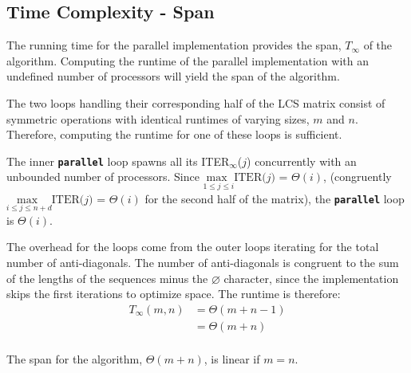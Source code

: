 \documentclass[usletter, 11pt]{extarticle}
\begin{document}
        \subsection{Time Complexity - Span} The running time for the parallel
        implementation provides the span, $T_{\infty}$ of the algorithm.
        Computing the runtime of the parallel implementation with an undefined
        number of processors will yield the span of the algorithm.

        The two loops handling their corresponding half of the LCS matrix
        consist of symmetric operations with identical runtimes of varying
        sizes, $m$ and $n$. Therefore, computing the runtime for one of these
        loops is sufficient.

        The inner \texttt{\textbf{parallel}} loop spawns all
        its ITER$_\infty$($j$) concurrently with an unbounded number of
        processors. Since $\underset{1 \le j \le i}{\text{max
        }}\text{ITER($j$)}$ = $\Theta(i)$, (congruently $\underset{i \le j \le
        n+d}{\text{max }}\text{ITER($j$)}$ = $\Theta(i)$ for the second
        half of the matrix), the \texttt{\textbf{parallel}} loop is
        $\Theta(i)$. \cite{Huang1989}

        The overhead for the loops come from the outer loops iterating for the
        total number of anti-diagonals. The number of anti-diagonals is congruent to the
        sum of the lengths of the sequences minus the $\varnothing$ character,
        since the implementation skips the first iterations to optimize space.
        The runtime is therefore:
        \begin{equation*}
            \begin{split}
                T_\infty(m, n) & = \Theta(m+n-1) \\
                & = \Theta(m+n) \\
            \end{split}
        \end{equation*}

        The span for the algorithm, $\Theta(m+n)$, is linear if $m = n$.
\end{document}
